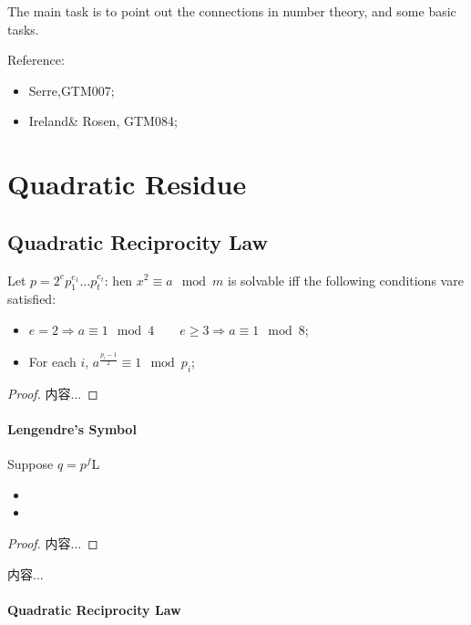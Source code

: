 \documentclass[Total.tex]{subfiles}
\begin{document}
	
	The main task is to point out the connections in number theory, and some basic tasks.
	
	
	Reference:
	\begin{itemize}
		\item Serre,GTM007;
		\item Ireland\& Rosen, GTM084;
	\end{itemize}
	\chapter{Quadratic Residue}	
		\section{Quadratic Reciprocity Law}
		\begin{proposition}
			Let $p=2^ep_1^{e_1}\dots p_t^{e_t}$: hen $x^2\equiv a\mod m$ is solvable iff the following conditions vare satisfied:
			\begin{itemize}
				\item $e=2\Rightarrow a\equiv 1\mod 4\qquad e\geq 3\Rightarrow a\equiv 1\mod 8$;
				\item For each $i$, $a^{\frac{p_i-1}{2}}\equiv 1\mod p_i$;
			\end{itemize}
		\end{proposition}
		\begin{proof}
			内容...
		\end{proof}
		
		\subsubsection{Lengendre's Symbol}
		
		\begin{theorem}
			Suppose $q=p^f$L
			\begin{itemize}
				\item 
				\item 
			\end{itemize}
		\end{theorem}
		\begin{proof}
			内容...
		\end{proof}
		\begin{Def}
			内容...
		\end{Def}
		\subsubsection{Quadratic Reciprocity Law}
\end{document}
